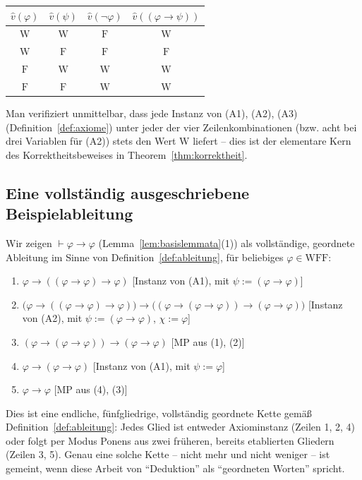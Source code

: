 \documentclass[12pt, a4paper]{article}
\theoremstyle{definition}
\theoremstyle{remark}
\newcommand{\W}{\mathrm{W}}
\newcommand{\F}{\mathrm{F}}
\newcommand{\WFF}{\mathrm{WFF}}
\begin{document}
\begin{center}
\begin{tabular}{cc|c|c}
\toprule
$\hat v(\varphi)$ & $\hat v(\psi)$ & $\hat v(\neg\varphi)$ & $\hat v((\varphi\to\psi))$ \\
\midrule
$\W$ & $\W$ & $\F$ & $\W$ \\
$\W$ & $\F$ & $\F$ & $\F$ \\
$\F$ & $\W$ & $\W$ & $\W$ \\
$\F$ & $\F$ & $\W$ & $\W$ \\
\bottomrule
\end{tabular}
\end{center}

Man verifiziert unmittelbar, dass jede Instanz von (A1), (A2), (A3) (Definition~\ref{def:axiome}) unter jeder der vier Zeilenkombinationen (bzw. acht bei drei Variablen für (A2)) stets den Wert $\W$ liefert -- dies ist der elementare Kern des Korrektheitsbeweises in Theorem~\ref{thm:korrektheit}.

\subsection{Eine vollständig ausgeschriebene Beispielableitung}
\label{app:beispielableitung}

Wir zeigen $\vdash \varphi\to\varphi$ (Lemma~\ref{lem:basislemmata}(1)) als vollständige, geordnete Ableitung im Sinne von Definition~\ref{def:ableitung}, für beliebiges $\varphi\in\WFF$:

\begin{enumerate}[label=(\arabic*)]
  \item $\varphi \to ((\varphi\to\varphi)\to\varphi)$ \hfill [Instanz von (A1), mit $\psi:=(\varphi\to\varphi)$]
  \item $\big(\varphi\to((\varphi\to\varphi)\to\varphi)\big)\to\big((\varphi\to(\varphi\to\varphi))\to(\varphi\to\varphi)\big)$ \hfill [Instanz von (A2), mit $\psi:=(\varphi\to\varphi)$, $\chi:=\varphi$]
  \item $(\varphi\to(\varphi\to\varphi))\to(\varphi\to\varphi)$ \hfill [MP aus (1), (2)]
  \item $\varphi \to (\varphi\to\varphi)$ \hfill [Instanz von (A1), mit $\psi:=\varphi$]
  \item $\varphi \to \varphi$ \hfill [MP aus (4), (3)]
\end{enumerate}

Dies ist eine endliche, fünfgliedrige, vollständig geordnete Kette gemäß Definition~\ref{def:ableitung}: Jedes Glied ist entweder Axiominstanz (Zeilen 1, 2, 4) oder folgt per Modus Ponens aus zwei früheren, bereits etablierten Gliedern (Zeilen 3, 5). Genau eine solche Kette -- nicht mehr und nicht weniger -- ist gemeint, wenn diese Arbeit von ``Deduktion'' als ``geordneten Worten'' spricht.
\end{document}
